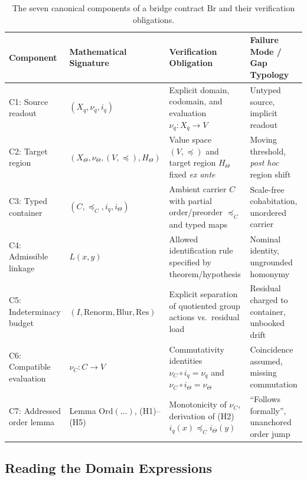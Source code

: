 \documentclass[11pt,a4paper]{article}
\begin{document}
\begin{table}[htbp]
\centering
\footnotesize
\renewcommand{\arraystretch}{0.95}
\caption{The seven canonical components of a bridge contract $\mathrm{Br}$ and their verification obligations.}
\label{tab:contract_components}\label{tab:vertrags_komponenten}
\begin{tabularx}{\textwidth}{@{} >{\raggedright\arraybackslash}p{} >{\raggedright\arraybackslash}p{} >{\raggedright\arraybackslash}X >{\raggedright\arraybackslash}X@{}}
\toprule
Component & Mathematical Signature & Verification Obligation & Failure Mode / Gap Typology \\
\midrule
C1: Source readout & $(X_q, \nu_q, i_q)$ & Explicit domain, codomain, and evaluation $\nu_q\colon X_q \to V$ & Untyped source, implicit readout \\
\addlinespace[3pt]
C2: Target region & $(X_\Theta, \nu_\Theta, (V,\preceq), H_\Theta)$ & Value space $(V,\preceq)$ and target region $H_\Theta$ fixed \emph{ex ante} & Moving threshold, \emph{post hoc} region shift \\
\addlinespace[3pt]
C3: Typed container & $(C, \preceq_C, i_q, i_\Theta)$ & Ambient carrier $C$ with partial order/preorder $\preceq_C$ and typed maps & Scale-free cohabitation, unordered carrier \\
\addlinespace[3pt]
C4: Admissible linkage & $L(x,y)$ & Allowed identification rule specified by theorem/hypothesis & Nominal identity, ungrounded homonymy \\
\addlinespace[3pt]
C5: Indeterminacy budget & $(I, \mathrm{Renorm},\allowbreak \mathrm{Blur},\allowbreak \mathrm{Res})$ & Explicit separation of quotiented group actions vs.\ residual load & Residual charged to container, unbooked drift \\
\addlinespace[3pt]
C6: Compatible evaluation & $\nu_C\colon C \to V$ & Commutativity identities $\nu_C\circ i_q=\nu_q$ and $\nu_C\circ i_\Theta=\nu_\Theta$ & Coincidence assumed, missing commutation \\
\addlinespace[3pt]
C7: Addressed order lemma & Lemma $\mathrm{Ord}(\dots)$, (H1)--(H5) & Monotonicity of $\nu_C$, derivation of (H2) $i_q(x)\preceq_C i_\Theta(y)$ & ``Follows formally'', unanchored order jump \\
\bottomrule
\end{tabularx}
\end{table}

\subsection{Reading the Domain Expressions}\label{sec:glossary}
\end{document}
